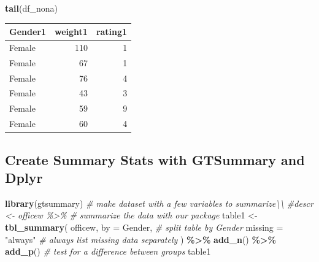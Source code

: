 \documentclass[
]{article}
\newenvironment{Shaded}{\begin{snugshade}}{\end{snugshade}}
\newcommand{\AttributeTok}[1]{\textcolor[rgb]{0.13,0.29,0.53}{#1}}
\newcommand{\CommentTok}[1]{\textcolor[rgb]{0.56,0.35,0.01}{\textit{#1}}}
\newcommand{\FunctionTok}[1]{\textcolor[rgb]{0.13,0.29,0.53}{\textbf{#1}}}
\newcommand{\NormalTok}[1]{#1}
\newcommand{\OtherTok}[1]{\textcolor[rgb]{0.56,0.35,0.01}{#1}}
\newcommand{\SpecialCharTok}[1]{\textcolor[rgb]{0.81,0.36,0.00}{\textbf{#1}}}
\newcommand{\StringTok}[1]{\textcolor[rgb]{0.31,0.60,0.02}{#1}}
\begin{document}
\begin{Shaded}
\begin{Highlighting}[]
\FunctionTok{tail}\NormalTok{(df\_nona)}
\end{Highlighting}
\end{Shaded}

\begin{longtable}[]{@{}lrr@{}}
\toprule\noalign{}
Gender1 & weight1 & rating1 \\
\midrule\noalign{}
\endhead
\bottomrule\noalign{}
\endlastfoot
Female & 110 & 1 \\
Female & 67 & 1 \\
Female & 76 & 4 \\
Female & 43 & 3 \\
Female & 59 & 9 \\
Female & 60 & 4 \\
\end{longtable}

\hypertarget{create-summary-stats-with-gtsummary-and-dplyr}{%
\subsection{Create Summary Stats with GTSummary and
Dplyr}\label{create-summary-stats-with-gtsummary-and-dplyr}}

\begin{Shaded}
\begin{Highlighting}[]
\FunctionTok{library}\NormalTok{(gtsummary)}
\CommentTok{\# make dataset with a few variables to summarize\textbackslash{}\textbackslash{}}
\CommentTok{\#descr \textless{}{-} officew  \%\textgreater{}\% }
\CommentTok{\# summarize the data with our package}
\NormalTok{table1 }\OtherTok{\textless{}{-}}
\FunctionTok{tbl\_summary}\NormalTok{(}
\NormalTok{officew,}
\AttributeTok{by =}\NormalTok{ Gender, }\CommentTok{\# split table by Gender}
\AttributeTok{missing =} \StringTok{"always"} \CommentTok{\# always list missing data separately}
\NormalTok{) }\SpecialCharTok{\%\textgreater{}\%}
\FunctionTok{add\_n}\NormalTok{() }\SpecialCharTok{\%\textgreater{}\%}
\FunctionTok{add\_p}\NormalTok{() }\CommentTok{\# test for a difference between groups}
\NormalTok{table1}
\end{Highlighting}
\end{Shaded}
\end{document}
